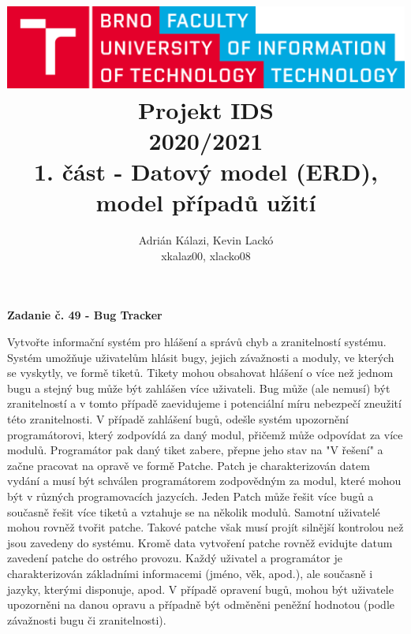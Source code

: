 \documentclass[10pt, a4paper]{article}
\title{\includegraphics[width=0.4\linewidth]{fig/logo_en.png}\vspace{1cm}\\\huge{Projekt IDS\\2020/2021}\\\vspace{1cm}1. část - Datový model (ERD), model případů užití}
\author{Adrián Kálazi, Kevin Lackó\\xkalaz00, xlacko08}
\date{}
\begin{document}
	
	\maketitle

	\bigskip

	\begin{center}
		\textbf{\Large{Zadanie č. 49 - Bug Tracker}}
	\end{center}

	Vytvořte informační systém pro hlášení a správů chyb a zranitelností systému.
	Systém umožňuje uživatelům hlásit bugy, jejich závažnosti a moduly, ve kterých se vyskytly, ve formě tiketů.
	Tikety mohou obsahovat hlášení o více než jednom bugu a stejný bug může být zahlášen více uživateli.
	Bug může (ale nemusí) být zranitelností a v tomto případě zaevidujeme i potenciální míru nebezpečí zneužití této zranitelnosti.
	V případě zahlášení bugů, odešle systém upozornění programátorovi, který zodpovídá za daný modul, přičemž může odpovídat za více modulů.
	Programátor pak daný tiket zabere, přepne jeho stav na "V řešení" a začne pracovat na opravě ve formě Patche.
	Patch je charakterizován datem vydání a musí být schválen programátorem zodpovědným za modul, které mohou být v různých programovacích jazycích.
	Jeden Patch může řešit více bugů a současně řešit více tiketů a vztahuje se na několik modulů.
	Samotní uživatelé mohou rovněž tvořit patche.
	Takové patche však musí projít silnější kontrolou než jsou zavedeny do systému.
	Kromě data vytvoření patche rovněž evidujte datum zavedení patche do ostrého provozu.
	Každý uživatel a programátor je charakterizován základními informacemi (jméno, věk, apod.), ale současně i jazyky, kterými disponuje, apod.
	V případě opravení bugů, mohou být uživatele upozorněni na danou opravu a případně být odměněni peněžní hodnotou (podle závažnosti bugu či zranitelnosti).
\end{document}

